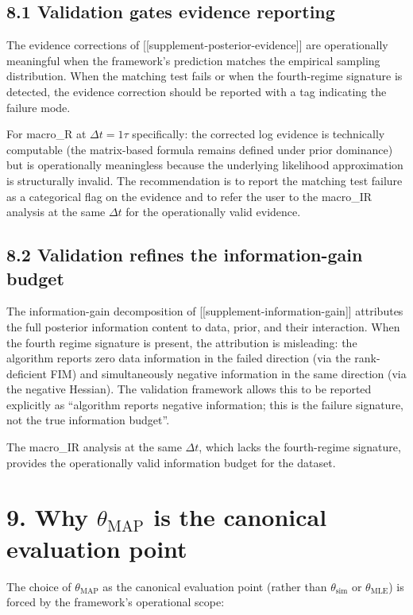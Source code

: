\documentclass[11pt]{article}
\begin{document}
\subsection*{8.1 Validation gates evidence reporting}

The evidence corrections of [[supplement-posterior-evidence]] are
operationally meaningful when the framework's prediction matches the
empirical sampling distribution. When the matching test fails or when
the fourth-regime signature is detected, the evidence correction
should be reported with a tag indicating the failure mode.

For macro\_R at $\Delta t = 1\tau$ specifically: the corrected log
evidence is technically computable (the matrix-based formula remains
defined under prior dominance) but is operationally meaningless because
the underlying likelihood approximation is structurally invalid. The
recommendation is to report the matching test failure as a categorical
flag on the evidence and to refer the user to the macro\_IR analysis
at the same $\Delta t$ for the operationally valid evidence.

\subsection*{8.2 Validation refines the information-gain budget}

The information-gain decomposition of [[supplement-information-gain]]
attributes the full posterior information content to data, prior, and
their interaction. When the fourth regime signature is present, the
attribution is misleading: the algorithm reports zero data
information in the failed direction (via the rank-deficient FIM) and
simultaneously negative information in the same direction (via the
negative Hessian). The validation framework allows this to be reported
explicitly as ``algorithm reports negative information; this is the
failure signature, not the true information budget''.

The macro\_IR analysis at the same $\Delta t$, which lacks the
fourth-regime signature, provides the operationally valid information
budget for the dataset.

\section*{9. Why $\theta_{\mathrm{MAP}}$ is the canonical evaluation point}
\label{sec:av-theta-MAP}

The choice of $\theta_{\mathrm{MAP}}$ as the canonical evaluation point
(rather than $\theta_{\mathrm{sim}}$ or $\theta_{\mathrm{MLE}}$) is
forced by the framework's operational scope:
\end{document}
